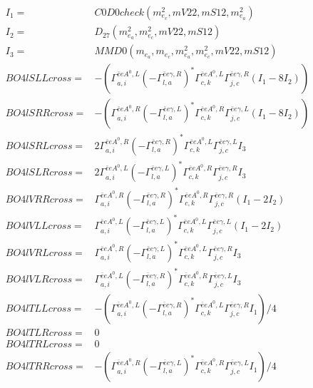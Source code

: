 \documentclass[A4,landscape]{article}
\begin{document}
\begin{align} 
I_1 = & C0D0check(m^2_{e_{{c}}}, mV22, mS12, m^2_{e_{{a}}}) \\ 
I_2 = & D_{27}(m^2_{e_{{a}}}, m^2_{e_{{c}}}, mV22, mS12) \\ 
I_3 = & MMD0(m_{e_{{a}}}, m_{e_{{c}}}, m^2_{e_{{a}}}, m^2_{e_{{c}}}, mV22, mS12) \\ 
  BO4lSLLcross= & -( \Gamma^{\bar{e}e A^0 ,L}_{a, i} (- \Gamma^{\bar{e}e \gamma ,R} _{l, a})^* \Gamma^{\bar{e}e A^0 ,L}_{c, k} \Gamma^{\bar{e}e \gamma ,R}_{j, c} (I_1 - 8 I_2)) \\ 
  BO4lSRRcross= & -( \Gamma^{\bar{e}e A^0 ,R}_{a, i} (- \Gamma^{\bar{e}e \gamma ,L} _{l, a})^* \Gamma^{\bar{e}e A^0 ,R}_{c, k} \Gamma^{\bar{e}e \gamma ,L}_{j, c} (I_1 - 8 I_2)) \\ 
  BO4lSRLcross= & 2  \Gamma^{\bar{e}e A^0 ,R}_{a, i} (- \Gamma^{\bar{e}e \gamma ,R} _{l, a})^* \Gamma^{\bar{e}e A^0 ,L}_{c, k} \Gamma^{\bar{e}e \gamma ,L}_{j, c} I_3 \\ 
  BO4lSLRcross= & 2  \Gamma^{\bar{e}e A^0 ,L}_{a, i} (- \Gamma^{\bar{e}e \gamma ,L} _{l, a})^* \Gamma^{\bar{e}e A^0 ,R}_{c, k} \Gamma^{\bar{e}e \gamma ,R}_{j, c} I_3 \\ 
  BO4lVRRcross= &  \Gamma^{\bar{e}e A^0 ,R}_{a, i} (- \Gamma^{\bar{e}e \gamma ,R} _{l, a})^* \Gamma^{\bar{e}e A^0 ,R}_{c, k} \Gamma^{\bar{e}e \gamma ,R}_{j, c} (I_1 - 2 I_2) \\ 
  BO4lVLLcross= &  \Gamma^{\bar{e}e A^0 ,L}_{a, i} (- \Gamma^{\bar{e}e \gamma ,L} _{l, a})^* \Gamma^{\bar{e}e A^0 ,L}_{c, k} \Gamma^{\bar{e}e \gamma ,L}_{j, c} (I_1 - 2 I_2) \\ 
  BO4lVRLcross= &  \Gamma^{\bar{e}e A^0 ,R}_{a, i} (- \Gamma^{\bar{e}e \gamma ,L} _{l, a})^* \Gamma^{\bar{e}e A^0 ,L}_{c, k} \Gamma^{\bar{e}e \gamma ,R}_{j, c} I_3 \\ 
  BO4lVLRcross= &  \Gamma^{\bar{e}e A^0 ,L}_{a, i} (- \Gamma^{\bar{e}e \gamma ,R} _{l, a})^* \Gamma^{\bar{e}e A^0 ,R}_{c, k} \Gamma^{\bar{e}e \gamma ,L}_{j, c} I_3 \\ 
  BO4lTLLcross= & -( \Gamma^{\bar{e}e A^0 ,L}_{a, i} (- \Gamma^{\bar{e}e \gamma ,R} _{l, a})^* \Gamma^{\bar{e}e A^0 ,L}_{c, k} \Gamma^{\bar{e}e \gamma ,R}_{j, c} I_1)/4 \\ 
  BO4lTLRcross= & 0 \\ 
  BO4lTRLcross= & 0 \\ 
  BO4lTRRcross= & -( \Gamma^{\bar{e}e A^0 ,R}_{a, i} (- \Gamma^{\bar{e}e \gamma ,L} _{l, a})^* \Gamma^{\bar{e}e A^0 ,R}_{c, k} \Gamma^{\bar{e}e \gamma ,L}_{j, c} I_1)/4 \\ 
\end{align} 
\end{document}
